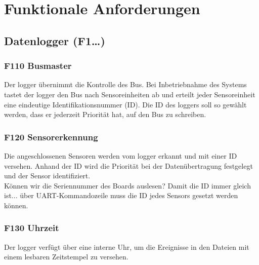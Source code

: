 %
%

\thispagestyle{empty}
\chapter{Funktionale Anforderungen}\label{chap.funktionale}
\section{Datenlogger (F1\ldots)}


\subsection{F110 Busmaster}
Der \gls{logger} übernimmt die Kontrolle des Bus. Bei Inbetriebnahme des Systems tastet der \gls{logger} den Bus nach Sensoreinheiten ab und erteilt jeder Sensoreinheit eine eindeutige Identifikationsnummer (ID). Die ID des \gls{logger}s soll so gewählt werden, dass er jederzeit Priorität hat, auf den Bus zu schreiben.


\subsection{F120 Sensorerkennung}
Die angeschlossenen Sensoren werden vom \gls{logger} erkannt und mit einer ID versehen. Anhand der ID wird die Priorität bei der Datenübertragung festgelegt und der Sensor identifiziert.\\
Können wir die Seriennummer des Boards auslesen? Damit die ID immer gleich ist... über UART-Kommandozeile muss die ID jedes Sensors gesetzt werden können.


\subsection{F130 Uhrzeit}
Der \gls{logger} verfügt über eine interne Uhr, um die Ereignisse in den Dateien mit einem lesbaren Zeitstempel zu versehen.


